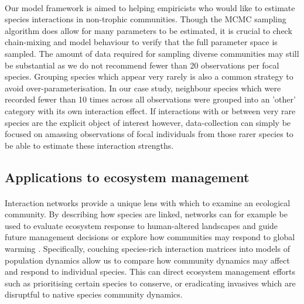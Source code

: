 \documentclass[a4,12pt]{article}
\begin{document}
        \paragraph{}
        Our model framework is aimed to helping empiricists who would like to estimate species interactions in non-trophic communities. Though the MCMC sampling algorithm does allow for many parameters to be estimated, it is crucial to check chain-mixing and model behaviour to verify that the full parameter space is sampled. The amount of data required for sampling diverse communities may still be substantial as we do not recommend fewer than 20 observations per focal species. Grouping species which appear very rarely is also a common strategy to avoid over-parameterisation. In our case study, neighbour species which were recorded fewer than 10 times across all observations were grouped into an 'other' category with its own interaction effect. If interactions with or between very rare species are the explicit object of interest however, data-collection can simply be focused on amassing observations of focal individuals from those rarer species to be able to estimate these interaction strengths.   


    \subsection{Applications to ecosystem management}

        \paragraph{}
        Interaction networks provide a unique lens with which to examine an ecological community. By describing how species are linked, networks can for example be used to evaluate ecosystem response to human-altered landscapes and guide future management decisions \parencite{Ross2011} or explore how communities may respond to global warming \parencite{Gorman2019}. Specifically, couching species-rich interaction matrices into models of population dynamics allow us to compare how community dynamics may affect and respond to individual species. This can direct ecosystem management efforts such as prioritising certain species to conserve, or eradicating invasives which are disruptful to native species community dynamics.
\end{document}
